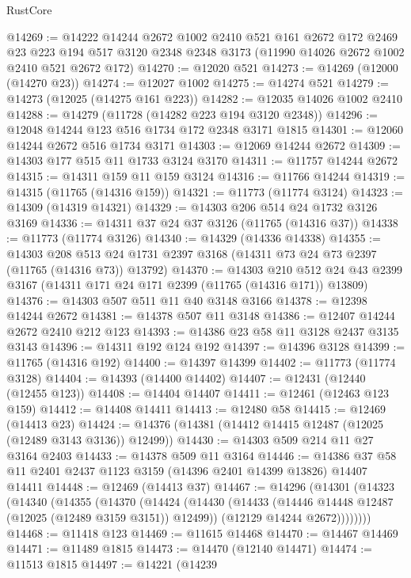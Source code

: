 \begin{lexlean}{RustCore}
\begin{coremodule}
@14269 := @14222
    @14244
    @2672
    @1002
    @2410
    @521
    @161
    @2672
    @172
    @2469
    @23
    @223
    @194
    @517
    @3120
    @2348
    @2348
    @3173
    (@11990 @14026 @2672 @1002 @2410 @521 @2672 @172)
@14270 := @12020 @521
@14273 := @14269 (@12000 (@14270 @23))
@14274 := @12027 @1002
@14275 := @14274 @521
@14279 := @14273 (@12025 (@14275 @161 @223))
@14282 := @12035 @14026 @1002 @2410
@14288 := @14279 (@11728 (@14282 @223 @194 @3120 @2348))
@14296 := @12048 @14244 @123 @516 @1734 @172 @2348 @3171 @1815
@14301 := @12060 @14244 @2672 @516 @1734 @3171
@14303 := @12069 @14244 @2672
@14309 := @14303 @177 @515 @11 @1733 @3124 @3170
@14311 := @11757 @14244 @2672
@14315 := @14311 @159 @11 @159 @3124
@14316 := @11766 @14244
@14319 := @14315 (@11765 (@14316 @159))
@14321 := @11773 (@11774 @3124)
@14323 := @14309 (@14319 @14321)
@14329 := @14303 @206 @514 @24 @1732 @3126 @3169
@14336 := @14311 @37 @24 @37 @3126 (@11765 (@14316 @37))
@14338 := @11773 (@11774 @3126)
@14340 := @14329 (@14336 @14338)
@14355 := @14303
    @208
    @513
    @24
    @1731
    @2397
    @3168
    (@14311 @73 @24 @73 @2397 (@11765 (@14316 @73)) @13792)
@14370 := @14303
    @210
    @512
    @24
    @43
    @2399
    @3167
    (@14311 @171 @24 @171 @2399 (@11765 (@14316 @171)) @13809)
@14376 := @14303 @507 @511 @11 @40 @3148 @3166
@14378 := @12398 @14244 @2672
@14381 := @14378 @507 @11 @3148
@14386 := @12407 @14244 @2672 @2410 @212 @123
@14393 := @14386 @23 @58 @11 @3128 @2437 @3135 @3143
@14396 := @14311 @192 @124 @192
@14397 := @14396 @3128
@14399 := @11765 (@14316 @192)
@14400 := @14397 @14399
@14402 := @11773 (@11774 @3128)
@14404 := @14393 (@14400 @14402)
@14407 := @12431 (@12440 (@12455 @123))
@14408 := @14404 @14407
@14411 := @12461 (@12463 @123 @159)
@14412 := @14408 @14411
@14413 := @12480 @58
@14415 := @12469 (@14413 @23)
@14424 := @14376 (@14381 (@14412 @14415 @12487 (@12025 (@12489 @3143 @3136)) @12499))
@14430 := @14303 @509 @214 @11 @27 @3164 @2403
@14433 := @14378 @509 @11 @3164
@14446 := @14386 @37 @58 @11 @2401 @2437 @1123 @3159 (@14396 @2401 @14399 @13826) @14407 @14411
@14448 := @12469 (@14413 @37)
@14467 := @14296
    (@14301
      (@14323
        (@14340
          (@14355
            (@14370
              (@14424
                (@14430
                  (@14433 (@14446 @14448 @12487 (@12025 (@12489 @3159 @3151)) @12499))
                  (@12129 @14244 @2672))))))))
@14468 := @11418 @123
@14469 := @11615 @14468
@14470 := @14467 @14469
@14471 := @11489 @1815
@14473 := @14470 (@12140 @14471)
@14474 := @11513 @1815
@14497 := @14221
    (@14239

\end{coremodule}
\end{lexlean}
